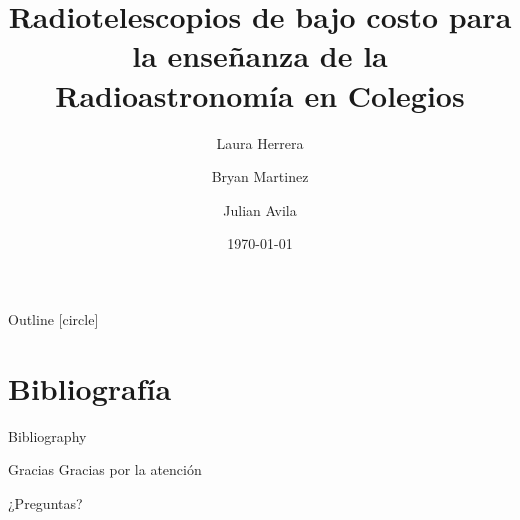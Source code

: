 \documentclass[aspectratio=169,sn-mathphys-num,spanish]{beamer}
\title{Radiotelescopios de bajo costo para la enseñanza de la Radioastronomía en Colegios}
\author{Laura Herrera \and Bryan Martinez \and Julian Avila}
\institute{Universidad Distrital Francisco José de Caldas}
\date{\today}
\begin{document}
\begin{frame}
	\titlepage
\end{frame}

\begin{frame}{Outline}
	[circle]
	\tableofcontents
\end{frame}





\section{Bibliografía}
\begin{frame}[allowframebreaks]{Bibliography}
	\printbibliography
	\nocite{*}
\end{frame}

\begin{frame}{Gracias}
	\centering
	{\LARGE Gracias por la atención}
	\vspace{0.5cm}

\Large ¿Preguntas?
\end{frame}
\end{document}
